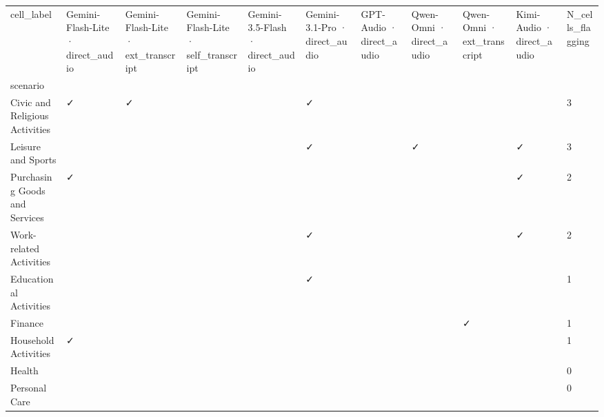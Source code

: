 \begin{tabular}{lllllllllll}
\toprule
cell_label & Gemini-Flash-Lite · direct\_audio & Gemini-Flash-Lite · ext\_transcript & Gemini-Flash-Lite · self\_transcript & Gemini-3.5-Flash · direct\_audio & Gemini-3.1-Pro · direct\_audio & GPT-Audio · direct\_audio & Qwen-Omni · direct\_audio & Qwen-Omni · ext\_transcript & Kimi-Audio · direct\_audio & N\_cells\_flagging \\
scenario &  &  &  &  &  &  &  &  &  &  \\
\midrule
Civic and Religious Activities & ✓ & ✓ &  &  & ✓ &  &  &  &  & 3 \\
Leisure and Sports &  &  &  &  & ✓ &  & ✓ &  & ✓ & 3 \\
Purchasing Goods and Services & ✓ &  &  &  &  &  &  &  & ✓ & 2 \\
Work-related Activities &  &  &  &  & ✓ &  &  &  & ✓ & 2 \\
Educational Activities &  &  &  &  & ✓ &  &  &  &  & 1 \\
Finance &  &  &  &  &  &  &  & ✓ &  & 1 \\
Household Activities & ✓ &  &  &  &  &  &  &  &  & 1 \\
Health &  &  &  &  &  &  &  &  &  & 0 \\
Personal Care &  &  &  &  &  &  &  &  &  & 0 \\
\bottomrule
\end{tabular}
